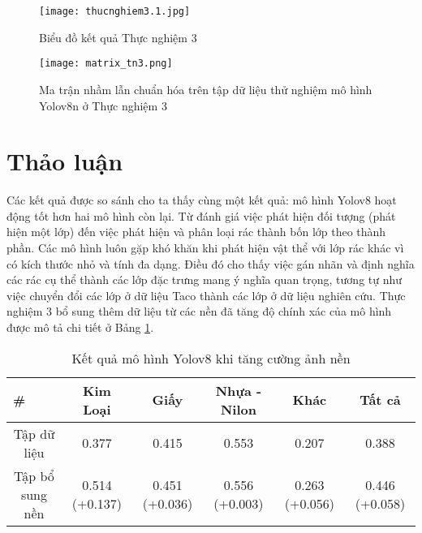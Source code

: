\documentclass[../the.tex]{subfiles}
\begin{document}
\begin{figure}[H]
    \centering
    \texttt{[image: thucnghiem3.1.jpg]}
    \caption{Biểu đồ kết quả Thực nghiệm 3}
    \label{fig:thucnghiem3}
\end{figure}

\begin{figure}[H]
    \centering
    \texttt{[image: matrix\_tn3.png]}
    \caption{Ma trận nhầm lẫn chuẩn hóa trên tập dữ liệu thử nghiệm mô hình Yolov8n ở Thực nghiệm 3}
    \label{fig:thucnghiem3.1}
\end{figure}


\section{Thảo luận}
 {\fontsize{13}{12} \selectfont
  Các kết quả được so sánh cho ta thấy cùng một kết quả: mô hình Yolov8 hoạt động tốt hơn hai mô hình còn lại.
  Từ đánh giá việc phát hiện đối tượng (phát hiện một lớp) đến việc phát hiện và phân loại rác thành bốn lớp theo thành phần.
  Các mô hình luôn gặp khó khăn khi phát hiện vật thể với lớp rác khác vì có kích thước nhỏ và tính đa dạng.
  Điều đó cho thấy việc gán nhãn và định nghĩa các rác cụ thể thành các lớp đặc trưng mang ý nghĩa quan trọng,
  tương tự như việc chuyển đổi các lớp ở dữ liệu Taco thành các lớp ở dữ liệu nghiên cứu.
  Thực nghiệm 3 bổ sung thêm dữ liệu từ các nền đã tăng độ chính xác của mô hình được mô tả chi tiết ở Bảng \ref{tab:thaoluan1}.
 }

\begin{table}[h!]
    \centering
    \caption{Kết quả mô hình Yolov8 khi tăng cường ảnh nền}
    \begin{tabular}{|c|c|c|c|c|c|}
        \hline
        \multicolumn{1}{|l|}{\textbf{\#}} & \textbf{Kim Loại} & \textbf{Giấy} & \textbf{Nhựa - Nilon} & \textbf{Khác} & \textbf{Tất cả} \\ \hline
        Tập dữ liệu                       & 0.377             & 0.415         & 0.553                 & 0.207         & 0.388           \\ \hline
        Tập bổ sung   nền                 & 0.514 \newline (+0.137)     & 0.451 \newline(+0.036) & 0.556 \newline(+0.003)         & 0.263 \newline(+0.056)  & 0.446 \newline(+0.058)    \\ \hline
    \end{tabular}
    \label{tab:thaoluan1}
\end{table}
\end{document}
